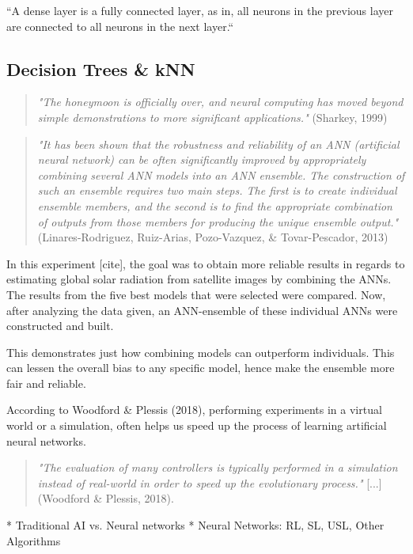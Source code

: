 \documentclass[
a4paper,
11pt,
english
]{report}
\begin{document}
“A dense layer is a fully connected layer, as in, all neurons in the previous layer are connected to all neurons in the next layer.“

\subsection{Decision Trees & kNN}


\begin{quote}
    \textit{"The honeymoon is officially over, and neural computing has moved beyond simple demonstrations to more significant applications."} (Sharkey, 1999)
\end{quote}

\begin{quote}
    \textit{"It has been shown that the robustness and reliability of an ANN (artificial neural network) can be often significantly improved by appropriately combining several ANN models into an ANN ensemble. The construction of such an ensemble requires two main steps. The first is to create individual ensemble members, and the second is to find the appropriate combination of outputs from those members for producing the unique ensemble output."} (Linares-Rodriguez, Ruiz-Arias, Pozo-Vazquez, & Tovar-Pescador, 2013)
\end{quote}

In this experiment [cite], the goal was to obtain more reliable results in regards to estimating global solar radiation from satellite images by combining the ANNs. The results from the five best models that were selected were compared. Now, after analyzing the data given, an ANN-ensemble of these individual ANNs were constructed and built.

This demonstrates just how combining models can outperform individuals. This can lessen the overall bias to any specific model, hence make the ensemble more fair and reliable.




According to Woodford & Plessis (2018), performing experiments in a virtual world or a simulation, often helps us speed up the process of learning artificial neural networks.
\begin{quote}
    \textit{"The evaluation of many controllers is typically performed in a simulation instead of real-world in order to speed up the evolutionary process."} [...] (Woodford & Plessis, 2018).
\end{quote}
* Traditional AI vs. Neural networks
* Neural Networks: RL, SL, USL, Other Algorithms
\end{document}
